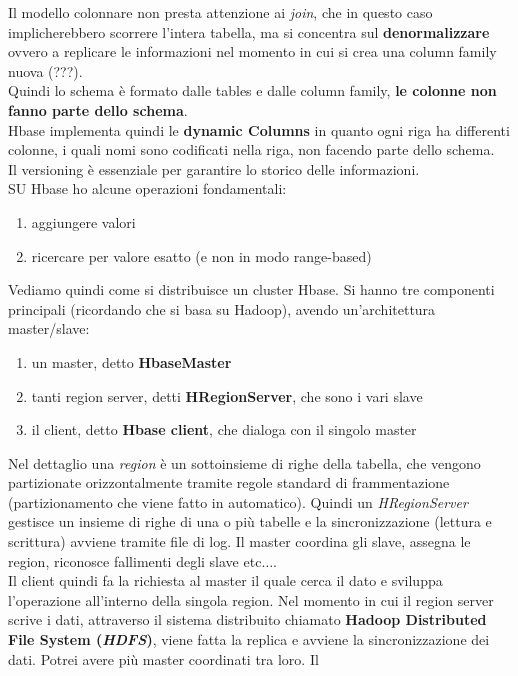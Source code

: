 \documentclass[a4paper,12pt, oneside]{book}
\begin{document}
Il modello colonnare non presta attenzione ai \textit{join}, che in questo caso
implicherebbero scorrere l'intera tabella, ma si concentra sul
\textbf{denormalizzare} ovvero a replicare le informazioni nel momento in cui si
crea una column family nuova (???).\\
Quindi lo schema è formato dalle tables e dalle column family, \textbf{le
  colonne non fanno parte dello schema}.\\
Hbase implementa quindi le \textbf{dynamic Columns} in quanto ogni riga ha
differenti colonne, i quali nomi sono codificati nella riga, non facendo parte
dello schema.\\
Il versioning è essenziale per garantire lo storico delle informazioni.\\
SU Hbase ho alcune operazioni fondamentali:
\begin{enumerate}
  \item aggiungere valori
  \item ricercare per valore esatto (e non in modo range-based)
\end{enumerate}
Vediamo quindi come si distribuisce un cluster Hbase. Si hanno tre componenti
principali (ricordando che si basa su Hadoop), avendo un'architettura
master/slave: 
\begin{enumerate}
  \item un master, detto \textbf{HbaseMaster}
  \item tanti region server, detti \textbf{HRegionServer}, che sono i vari slave
  \item il client, detto \textbf{Hbase client}, che dialoga con il singolo
  master 
\end{enumerate}
Nel dettaglio una \textit{region} è un sottoinsieme di righe della tabella, che
vengono partizionate orizzontalmente tramite regole standard di
frammentazione (partizionamento che viene fatto in automatico). Quindi un
\textit{HRegionServer} gestisce un insieme di righe di una o più tabelle e la
sincronizzazione (lettura e scrittura) avviene tramite file di log. Il master
coordina gli slave, assegna le region, riconosce fallimenti degli slave
etc$\ldots$.\\
Il client quindi fa la richiesta al master il quale cerca il dato e sviluppa
l'operazione all'interno della singola region. Nel momento in cui il region
server scrive i dati, attraverso il sistema distribuito chiamato \textbf{Hadoop
  Distributed File System (\textit{HDFS})}, viene fatta la replica e avviene la
sincronizzazione dei dati. Potrei avere più master coordinati tra loro. Il
\end{document}
